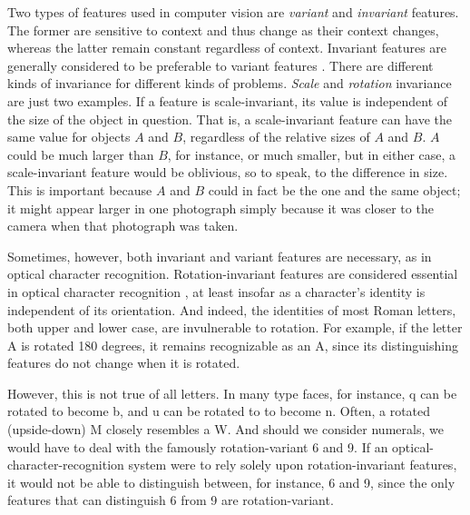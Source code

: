 Two types of features used in computer vision are \emph{variant} and \emph{invariant} features.
The former are sensitive to context and thus change as their context changes, whereas
the latter remain constant regardless of context.
Invariant features are generally considered to be preferable to variant 
features \citep{hossain-et-al:2012}. 
There are different kinds of invariance for different kinds of problems.
\emph{Scale} and \emph{rotation} invariance are just two examples. If a feature 
is scale-invariant, its
value is independent of the size of the object in question. That is, a 
scale-invariant feature
can have the same value for objects $A$ and $B$, regardless of the 
relative sizes of $A$ and $B$. $A$ could be much larger than $B$, for instance, or much smaller,
but in either case, a scale-invariant feature would be oblivious, so to speak, to the difference in size. 
This is important because $A$ and $B$ could in fact be the one and the same object; it might appear 
larger in one photograph simply because 
it was closer to the camera when that photograph was taken.

Sometimes, however, both invariant and variant features are necessary, 
as in optical character recognition\citep{trier-et-al:1996}.
Rotation-invariant features are considered essential in optical character recognition \citep{trier-et-al:1996}, 
at least
insofar as a character's identity is independent 
of its orientation.
And indeed, the identities of most Roman letters, both upper and lower case, are invulnerable to rotation.
For example, if the letter \textsf{A} is rotated 180 degrees, it remains 
recognizable as an \textsf{A}, since its distinguishing features do not change when it is rotated. 

 
However, this is not true of all letters. In many type faces, for instance, 
\textsf{q} can be rotated to become \textsf{b}, and \textsf{u} can be rotated to 
to become \textsf{n}. Often, a rotated (upside-down) \textsf{M} closely 
resembles a \textsf{W}. And should we consider numerals, we would have to deal 
with the famously rotation-variant \textsf{6} and \textsf{9}. If an 
optical-character-recognition system were to rely solely upon rotation-invariant features, it
would not be able to distinguish between, for instance, \textsf{6} and 
\textsf{9}, since the only features that can distinguish \textsf{6} from \textsf{9}
are rotation-variant.

